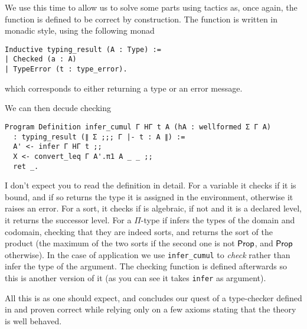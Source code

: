 We use \Program this time to allow us to solve some parts using tactics as,
once again, the function is defined to be correct by construction.
The function is written in monadic style, using the following monad
\begin{verbatim}
Inductive typing_result (A : Type) :=
| Checked (a : A)
| TypeError (t : type_error).
\end{verbatim}
which corresponds to either returning a type or an error message.

We can then decude checking
\begin{verbatim}
Program Definition infer_cumul Γ HΓ t A (hA : wellformed Σ Γ A)
  : typing_result (∥ Σ ;;; Γ |- t : A ∥) :=
  A' <- infer Γ HΓ t ;;
  X <- convert_leq Γ A'.π1 A _ _ ;;
  ret _.
\end{verbatim}

I don't expect you to read the definition in detail. For a variable it checks if
it is bound, and if so returns the type it is assigned in the environment,
otherwise it raises an error.
For a sort, it checks if is algebraic, if not and it is a declared level,
it returns the successor level.
For a \(\Pi\)-type if infers the types of the domain and codomain, checking that
they are indeed sorts, and returns the sort of the product (\ie the maximum
of the two sorts if the second one is not \(\mathsf{Prop}\), and \(\mathsf{Prop}\) otherwise).
In the case of application we use \texttt{infer_cumul} to \emph{check}
rather than infer the type of the argument. The checking function is defined
afterwards so this is another version of it (as you can see it takes
\texttt{infer} as argument).

All this is as one should expect, and concludes our quest of a type-checker
defined in \Coq and proven correct while relying only on a few axioms stating
that the theory is well behaved.